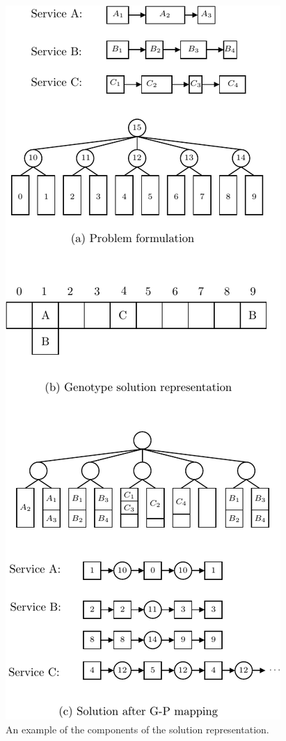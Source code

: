 \begin{figure}
    \includegraphics{figures/operators/mapping-crop}
    \caption{An example of the components of the solution representation.}
    \label{fig:mapping}
\end{figure}

